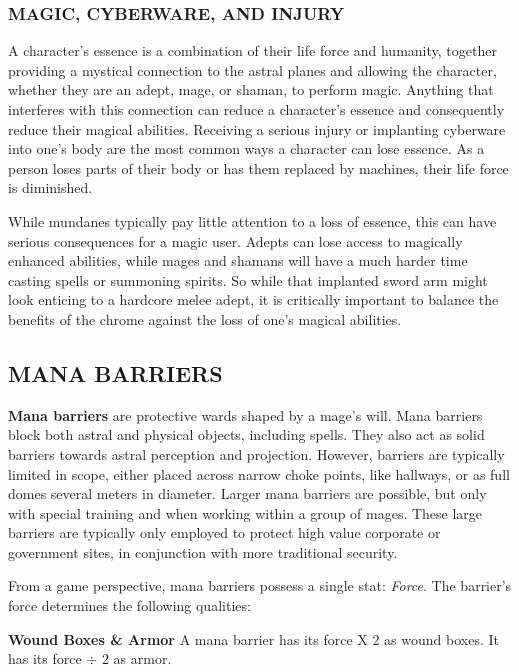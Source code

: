 \documentclass[oneside,10pt]{article}
\begin{document}
\begin{multicols}{2}
\subsubsection{MAGIC, CYBERWARE, AND INJURY}

A character's essence is a combination of their life force and
humanity, together providing a mystical connection to the astral
planes and allowing the character, whether they are an adept, mage, or
shaman, to perform magic. Anything that interferes with this
connection can reduce a character's essence and consequently reduce
their magical abilities. Receiving a serious injury or implanting
cyberware into one's body are the most common ways a character can
lose essence. As a person loses parts of their body or has them
replaced by machines, their life force is diminished.

While mundanes typically pay little attention to a loss of essence,
this can have serious consequences for a magic user. Adepts can lose
access to magically enhanced abilities, while mages and shamans will
have a much harder time casting spells or summoning spirits. So while
that implanted sword arm might look enticing to a hardcore melee
adept, it is critically important to balance the benefits of the
chrome against the loss of one's magical abilities.

\subsection{MANA BARRIERS}

\textbf{Mana barriers} are protective wards shaped by a mage's
will. Mana barriers block both astral and physical objects, including
spells. They also act as solid barriers towards astral perception and
projection. However, barriers are typically limited in scope, either
placed across narrow choke points, like hallways, or as full domes
several meters in diameter. Larger mana barriers are possible, but
only with special training and when working within a group of
mages. These large barriers are typically only employed to protect
high value corporate or government sites, in conjunction with more
traditional security.

From a game perspective, mana barriers possess a single stat:
\textit{Force}. The barrier's force determines the following qualities:

\begin{dent}

  \textbf{Wound Boxes \& Armor} A mana barrier has its force X 2 as
  wound boxes. It has its force $\div$ 2 as armor.


\end{dent}
\end{multicols}
\end{document}
